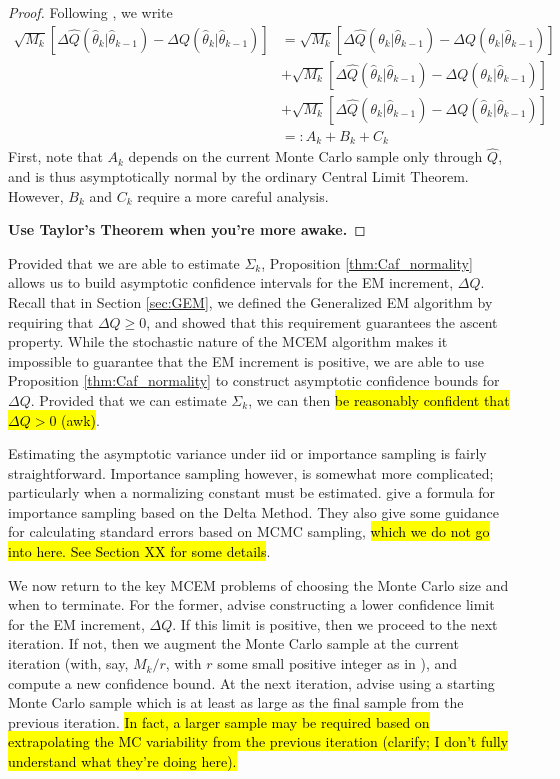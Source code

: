 \documentclass[11pt, oneside]{article}   	%
\begin{document}
\begin{proof}
    Following \citet{Caf05}, we write
    \begin{align}
        \sqrt{M_k} \left[ \Delta \hat{Q}(\hat{\theta}_k|\hat{\theta}_{k-1}) - \Delta Q(\hat{\theta}_k|\hat{\theta}_{k-1}) \right] &= \sqrt{M_k} \left[ \Delta \hat{Q}(\theta_k|\hat{\theta}_{k-1}) - \Delta Q(\theta_k|\hat{\theta}_{k-1}) \right] \nonumber \\
        & + \sqrt{M_k} \left[ \Delta \hat{Q}(\hat{\theta}_k|\hat{\theta}_{k-1}) - \Delta Q(\theta_k|\hat{\theta}_{k-1}) \right]\\
        & + \sqrt{M_k} \left[ \Delta \hat{Q}(\theta_k|\hat{\theta}_{k-1}) - \Delta Q(\hat{\theta}_k|\hat{\theta}_{k-1}) \right]\\
        &=: A_k + B_k + C_k
    \end{align}
    First, note that $A_k$ depends on the current Monte Carlo sample only through $\hat{Q}$, and is thus asymptotically normal by the ordinary Central Limit Theorem. However, $B_k$ and $C_k$ require a more careful analysis.

    \textbf{Use Taylor's Theorem when you're more awake.}
\end{proof}

Provided that we are able to estimate $\Sigma_k$, Proposition \ref{thm:Caf_normality} allows us to build asymptotic confidence intervals for the EM increment, $\Delta Q$. Recall that in Section \ref{sec:GEM}, we defined the Generalized EM algorithm by requiring that $\Delta Q \geq 0$, and showed that this requirement guarantees the ascent property. While the stochastic nature of the MCEM algorithm makes it impossible to guarantee that the EM increment is positive, we are able to use Proposition \ref{thm:Caf_normality} to construct asymptotic confidence bounds for $\Delta Q$. Provided that we can estimate $\Sigma_k$, we can then \hl{be reasonably confident that $\Delta Q > 0$ (awk)}.

Estimating the asymptotic variance under iid or importance sampling is fairly straightforward. Importance sampling however, is somewhat more complicated; particularly when a normalizing constant must be estimated. \citeauthor{Caf05} give a formula for importance sampling based on the Delta Method. They also give some guidance for calculating standard errors based on MCMC sampling, \hl{which we do not go into here. See Section XX for some details}. 

We now return to the key MCEM problems of choosing the Monte Carlo size and when to terminate. For the former, \citeauthor{Caf05} advise constructing a lower confidence limit for the EM increment, $\Delta Q$. If this limit is positive, then we proceed to the next iteration. If not, then we augment the Monte Carlo sample at the current iteration (with, say, $M_k/r$, with $r$ some small positive integer as in \citealp{Boo99}), and compute a new confidence bound. At the next iteration, \citeauthor{Caf05} advise using a starting Monte Carlo sample which is at least as large as the final sample from the previous iteration. \hl{In fact, a larger sample may be required based on extrapolating the MC variability from the previous iteration (clarify; I don't fully understand what they're doing here).}
\end{document}
